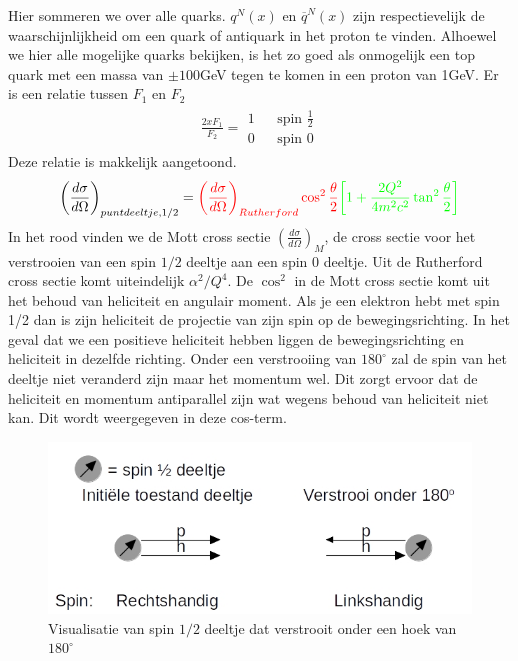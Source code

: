 \documentclass[../main.tex]{subfiles}
\begin{document}
Hier sommeren we over alle quarks. $q^N(x)$ en $\overline q^N(x)$ zijn respectievelijk de waarschijnlijkheid om een quark of antiquark in het proton te vinden. Alhoewel we hier alle mogelijke quarks bekijken, is het zo goed als onmogelijk een top quark met een massa van $\pm100$GeV tegen te komen in een proton van 1GeV. Er is een relatie tussen $F_1$ en $F_2$
\begin{equation}
    \begin{aligned}
        \label{eq:struct_func_rel}
        \frac{2xF_1}{F_2} =
        \begin{matrix}
            1 & & \text{spin } \frac{1}{2} \\
            0 & & \text{spin } 0
        \end{matrix}
    \end{aligned}
\end{equation}
Deze relatie is makkelijk aangetoond.
\begin{equation}
    \begin{aligned}
        \label{eq:bewijs_struct_func_rel_1}
        \left(\frac{d\sigma}{d\Omega}\right)_{puntdeeltje,1/2} = {\color{red} \left(\frac{d\sigma}{d\Omega}\right)_{Rutherford}\cos^2  \frac{\theta}{2}} {\color{green} \left[1+ \frac{2Q^2}{4m^2c^2} \tan^2 \frac{\theta}{2} \right]}
    \end{aligned}
\end{equation}
In het rood vinden we de Mott cross sectie $\left(\frac{d\sigma}{d\Omega}\right)_{M}$, de cross sectie voor het verstrooien van een spin $1/2$ deeltje aan een spin $0$ deeltje. Uit de Rutherford cross sectie komt uiteindelijk $\alpha^2/Q^4$. De $\cos^2$ in de Mott cross sectie komt uit het behoud van heliciteit en angulair moment. Als je een elektron hebt met spin 1/2 dan is zijn heliciteit de projectie van zijn spin op de bewegingsrichting. In het geval dat we een positieve heliciteit hebben liggen de bewegingsrichting en heliciteit in dezelfde richting. Onder een verstrooiing van $180^\circ$ zal de spin van het deeltje niet veranderd zijn maar het momentum wel. Dit zorgt ervoor dat de heliciteit en momentum antiparallel zijn wat wegens behoud van heliciteit niet kan. Dit wordt weergegeven in deze cos-term.

\begin{figure}[h]
    \centering
    \includegraphics[width=0.8\linewidth]{DIS_nucleon_structuur_pdf/mot_cross_section.jpg}
    \caption{Visualisatie van spin $1/2$ deeltje dat verstrooit onder een hoek van $180^\circ$}%
    \label{fig:mot_cross_section}
\end{figure}
\end{document}
